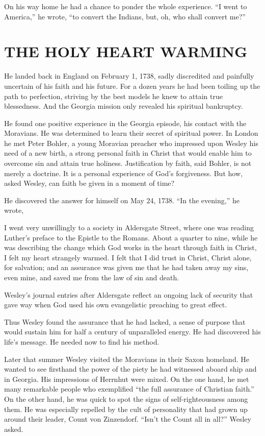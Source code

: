 On his way home he had a chance to ponder the whole experience. “I went to America,” he wrote, “to
convert the Indians, but, oh, who shall convert me?”

\section{THE HOLY HEART WARMING}

He landed back in England on February 1, 1738, sadly discredited and painfully uncertain of his
faith and his future. For a dozen years he had been toiling up the path to perfection, striving by
the best models he knew to attain true blessedness. And the Georgia mission only revealed his
spiritual bankruptcy.

He found one positive experience in the Georgia episode, his contact with the Moravians. He was
determined to learn their secret of spiritual power. In London he met Peter Bohler, a young Moravian
preacher who impressed upon Wesley his need of a new birth, a strong personal faith in Christ that
would enable him to overcome sin and attain true holiness. Justification by faith, said Bohler, is
not merely a doctrine. It is a personal experience of God’s forgiveness. But how, asked Wesley, can
faith be given in a moment of time?

He discovered the answer for himself on May 24, 1738. “In the evening,” he wrote,

\begin{blockquote}
I went very unwillingly to a society in Aldersgate Street, where one was reading Luther’s preface to
the Epistle to the Romans. About a quarter to nine, while he was describing the change which God
works in the heart through faith in Christ, I felt my heart strangely warmed. I felt that I did
trust in Christ, Christ alone, for salvation; and an assurance was given me that he had taken away
my sins, even mine, and saved me from the law of sin and death.
\end{blockquote}

Wesley’s journal entries after Aldersgate reflect an ongoing lack of security that gave way when God
used his own evangelistic preaching to great effect.

Thus Wesley found the assurance that he had lacked, a sense of purpose that would sustain him for
half a century of unparalleled energy. He had discovered his life’s message. He needed now to find
his method.

Later that summer Wesley visited the Moravians in their Saxon homeland. He wanted to see firsthand
the power of the piety he had witnessed aboard ship and in Georgia. His impressions of Herrnhut were
mixed. On the one hand, he met many remarkable people who exemplified “the full assurance of
Christian faith.” On the other hand, he was quick to spot the signs of self-righteousness among
them. He was especially repelled by the cult of personality that had grown up around their leader,
Count von Zinzendorf. “Isn’t the Count all in all?” Wesley asked.

